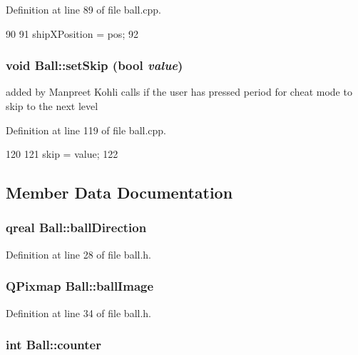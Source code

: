 Definition at line 89 of file ball.cpp.


\begin{DoxyCode}
90 {
91     shipXPosition = pos;
92 }
\end{DoxyCode}
\hypertarget{class_ball_af0419f8ca126be79df52185f51bec278}{
\subsubsection[{setSkip}]{\setlength{\rightskip}{0pt plus 5cm}void Ball::setSkip (bool {\em value})}}
\label{class_ball_af0419f8ca126be79df52185f51bec278}
added by Manpreet Kohli calls if the user has pressed period for cheat mode to skip to the next level 

Definition at line 119 of file ball.cpp.


\begin{DoxyCode}
120 {
121     skip = value;
122 }
\end{DoxyCode}


\subsection{Member Data Documentation}
\hypertarget{class_ball_a94c4804af675557bf6f59c9db0426eb4}{
\subsubsection[{ballDirection}]{\setlength{\rightskip}{0pt plus 5cm}qreal {\bf Ball::ballDirection}}}
\label{class_ball_a94c4804af675557bf6f59c9db0426eb4}


Definition at line 28 of file ball.h.\hypertarget{class_ball_a45214a2a52bbb8d2635e2233d7be8d91}{
\subsubsection[{ballImage}]{\setlength{\rightskip}{0pt plus 5cm}QPixmap {\bf Ball::ballImage}}}
\label{class_ball_a45214a2a52bbb8d2635e2233d7be8d91}


Definition at line 34 of file ball.h.\hypertarget{class_ball_a4228ca7d0e514c7a5396756301a451e6}{
\subsubsection[{counter}]{\setlength{\rightskip}{0pt plus 5cm}int {\bf Ball::counter}}}
\label{class_ball_a4228ca7d0e514c7a5396756301a451e6}


